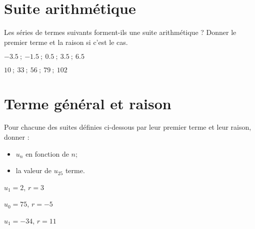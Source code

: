 	\section{Suite arithmétique}
Les séries de termes suivants forment-ils une suite arithmétique ? Donner le premier terme et la raison si c'est le cas.
\begin{questions}
	
	
	\question[2] $\num{-3.5} \: ; \: \num{-1.5} \: ; \: \num{0.5}  \: ; \:  \num{3.5} \: ; \: \num{6.5}$ 
	\fillwithdottedlines{3cm}
	
	\question[2] $\num{10} \: ; \:  \num{33} \: ; \: \num{56} \: ; \: \num{79} \: ; \: \num{102}$ 
	\fillwithdottedlines{3cm}
	
\end{questions}


\section{Terme général et raison}

Pour chacune des suites définies ci-dessous par leur premier terme et leur raison, donner :
\begin{itemize}
	\item $u_n$ en fonction de $n$;
	\item la valeur de $u_{25}$ terme.
\end{itemize} 
\begin{questions}
	
	
	\question[2] $u_1 = 2$, $r= 3$
	
	\fillwithdottedlines{6cm}
	
	\question[2] $u_0 = 75$, $r= -5$
	
	\fillwithdottedlines{6cm}
	
	\question[2] $u_1 = -34$, $r=11$
	
	\fillwithdottedlines{6cm}
\end{questions}

